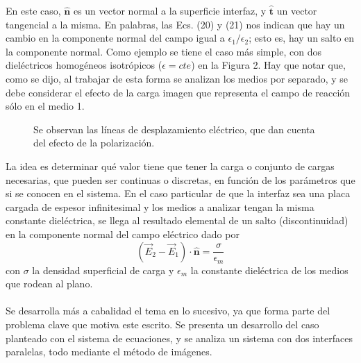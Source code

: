 \documentclass[12pt, oneside, numbers, spanish]{ezthesis}
\numberwithin{equation}{section}
\begin{document}
En este caso, $\hat{\mathbf{n}}$ es un vector normal a la superficie interfaz, y $\hat{\mathbf{t}}$ un vector tangencial a la misma. En palabras, las Ecs. (20) y (21) nos indican que hay un cambio en la componente normal del campo igual a $\epsilon_1/\epsilon_2$; esto es, hay un salto en la componente normal. Como ejemplo se tiene el caso más simple, con dos dieléctricos homogéneos isotrópicos ($\epsilon = cte$) en la Figura 2. Hay que notar que, como se dijo, al trabajar de esta forma se analizan los medios por separado, y se debe considerar el efecto de la carga imagen que representa el campo de reacción sólo en el medio 1.
\begin{figure}[H]
\vspace{2cm}
\centering

\caption{Se observan las líneas de desplazamiento eléctrico, que dan cuenta del efecto de la polarización.}
\end{figure}
\noindent
La idea es determinar qué valor tiene que tener la carga o conjunto de cargas necesarias, que pueden ser continuas o discretas, en función de los parámetros que si se conocen en el sistema. En el caso particular de que la interfaz sea una placa cargada de espesor infinitesimal y los medios a analizar tengan la misma constante dieléctrica, se llega al resultado elemental de un salto (discontinuidad) en la componente normal del campo eléctrico dado por
\begin{equation}
(\vec{E}_2 - \vec{E}_1)\cdot\hat{\mathbf{n}} = \frac{\sigma}{\epsilon_m}
\end{equation}
con $\sigma$ la densidad superficial de carga y $\epsilon_m$ la constante dieléctrica de los medios que rodean al plano. \\\\
Se desarrolla más a cabalidad el tema en lo sucesivo, ya que forma parte del problema clave que motiva este escrito. Se presenta un desarrollo del caso planteado con el sistema de ecuaciones, y se analiza un sistema con dos interfaces paralelas, todo mediante el método de imágenes. 
\end{document}
